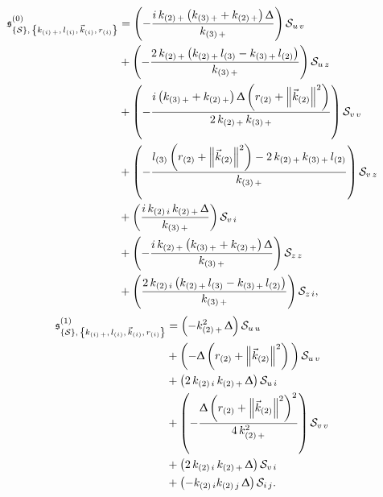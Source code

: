 \begin{equation}
  \begin{split}
    \ffs^{(0)}_{\qty{\cS},\, \kmkrN{i}}
    & =
    \qty(%
      -\frac{%
        i\, k_{\qty(2)\, +}\, \qty(k_{\qty(3)\, +} + k_{\qty(2)\, +})\, \Delta
      }{%
        k_{\qty(3)\, +}
      }
    )\,
    \cS_{u\, v} 
    \\
    & +
    \qty(%
      -
      \frac{%
        2\, k_{\qty(2)\, +}\,
        \qty(%
          k_{\qty(2)\, +}\, l_{\qty(3)}
          -
          k_{\qty(3)\, +}\, l_{\qty(2)}
        )
      }{%
        k_{\qty(3)\, +}
      }
    )\,
    \cS_{u\, z} 
    \\
    & +
    \qty(%
      -
      \frac{%
        i\, \qty(%
          k_{\qty(3)\, +}
          +
          k_{\qty(2)\, +})\, \Delta\, \qty(r_{(2)} + \norm{\vec{k}_{(2)}}^2)
      }{%
        2\, k_{\qty(2)\, +}\, k_{\qty(3)\, +}
      }
    )\,
    \cS_{v\, v} 
    \\
    & +
    \qty(%
      -
      \frac{%
        l_{\qty(3)}\, \qty(r_{(2)} + \norm{\vec{k}_{(2)}}^2)
        -
        2\, k_{\qty(2)\, +}\, k_{\qty(3)\, +}\, l_{\qty(2)}
      }{%
        k_{\qty(3)\, +}
      }
    )\,
    \cS_{v\, z} 
    \\
    & +
    \qty(%
      \frac{%
        i\, k_{\qty(2)\, i}\, k_{\qty(2)\, +}\, \Delta
      }{%
        k_{\qty(3)\, +}
      }
    )\,
    \cS_{v\,{i}} 
    \\
    & +
    \qty(%
      -
      \frac{%
        i\, k_{\qty(2)\, +}\, \qty(k_{\qty(3)\, +} + k_{\qty(2)\, +})\, \Delta
      }{%
        k_{\qty(3)\, +}
      }
    )\,
    \cS_{z\, z} 
    \\
    & +
    \qty(%
      \frac{%
        2\, k_{\qty(2)\, i}\,
        \qty(%
          k_{\qty(2)\, +}\, l_{\qty(3)}
          -
          k_{\qty(3)\, +}\, l_{\qty(2)}
        )
      }{%
        k_{\qty(3)\, +}
      }
    )\,
    \cS_{z\,{i}},
  \end{split}
\end{equation}
\begin{equation}
  \begin{split}
    \ffs^{(1)}_{\qty{\cS},\, \kmkrN{i}}
    & =
    \qty(%
      -k_{\qty(2)\, +}^2\, \Delta
    )\,
    \cS_{u\, u} 
    \\
    & +
    \qty(%
      -\Delta\, \qty(r_{(2)} + \norm{\vec{k}_{(2)}}^2)\,
    )\,
    \cS_{u\, v} 
    \\
    & +
    \qty(%
      2\, k_{\qty(2)\, i}\, k_{\qty(2)\, +}\, \Delta
    )\,
    \cS_{u\,{i}} 
    \\
    & +
    \qty(%
      -
      \frac{%
        \Delta\, \qty(r_{(2)} + \norm{\vec{k}_{(2)}}^2)^2
      }{%
        4\, k_{\qty(2)\, +}^2
      }
    )\,
    \cS_{v\, v} 
    \\
    & +
    \qty(%
      2\, k_{\qty(2)\, i}\, k_{\qty(2)\, +}\, \Delta
    )\,
    \cS_{v\,{i}} 
    \\
    & +
    \qty(- k_{\qty(2)\, i} k_{\qty(2)\, j}\, \Delta)\,
    \cS_{{i}\,{j}}.
  \end{split}
\end{equation}


